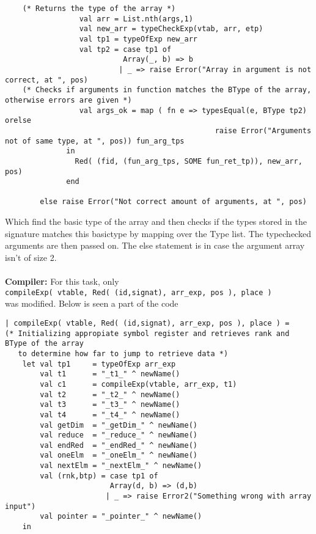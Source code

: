 \documentclass[12pt]{article}
\begin{document}
    \begin{verbatim}
    (* Returns the type of the array *)
                 val arr = List.nth(args,1)
                 val new_arr = typeCheckExp(vtab, arr, etp)
                 val tp1 = typeOfExp new_arr
                 val tp2 = case tp1 of
                           Array(_, b) => b
                          | _ => raise Error("Array in argument is not correct, at ", pos)
    (* Checks if arguments in function matches the BType of the array, otherwise errors are given *)
                 val args_ok = map ( fn e => typesEqual(e, BType tp2) orelse
                                                raise Error("Arguments not of same type, at ", pos)) fun_arg_tps
              in
                Red( (fid, (fun_arg_tps, SOME fun_ret_tp)), new_arr, pos) 
              end
        
        else raise Error("Not correct amount of arguments, at ", pos)
    \end{verbatim}
\endgroup
Which find the basic type of the array and then checks if the types stored in the signature matches this basictype by mapping over the Type list. The typechecked arguments are then passed on. The else statement is in case the argument array isn't of size 2.\\
\\
\textbf{Compiler:} For this task, only\\
\texttt{compileExp( vtable, Red( (id,signat), arr\_exp, pos ), place )} \\
was modified.
Below is seen a part of the code
\begingroup
    \fontsize{7pt}{12pt}\selectfont
    \begin{verbatim}
| compileExp( vtable, Red( (id,signat), arr_exp, pos ), place ) =
(* Initializing appropiate symbol register and retrieves rank and BType of the array 
   to determine how far to jump to retrieve data *)
    let val tp1     = typeOfExp arr_exp
        val t1      = "_t1_" ^ newName()
        val c1      = compileExp(vtable, arr_exp, t1)
        val t2      = "_t2_" ^ newName()
        val t3      = "_t3_" ^ newName()
        val t4      = "_t4_" ^ newName()
        val getDim  = "_getDim_" ^ newName()
        val reduce  = "_reduce_" ^ newName()
        val endRed  = "_endRed_" ^ newName()
        val oneElm  = "_oneElm_" ^ newName()
        val nextElm = "_nextElm_" ^ newName()
        val (rnk,btp) = case tp1 of
                        Array(d, b) => (d,b)
                       | _ => raise Error2("Something wrong with array input")
        val pointer = "_pointer_" ^ newName()
    in
    \end{verbatim}
\end{document}
